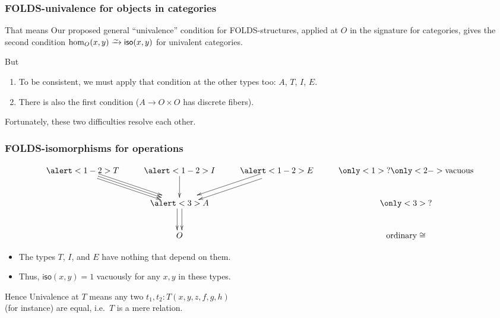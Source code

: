 \documentclass{beamer}
\begin{document}
\begin{frame}
  \frametitle{FOLDS-univalence for objects in categories}
  \begin{block}{That means}
    Our proposed general ``univalence'' condition for FOLDS-structures, applied at $O$ in the signature for categories, gives the second condition $\hom_O(x,y) \toiso \mathsf{iso}(x,y)$ for univalent categories.
  \end{block}
  \begin{block}{But}
    \begin{enumerate}
    \item To be consistent, we must apply that condition at the other types too: $A$, $T$, $I$, $E$.
    \item There is also the first condition ($A\to O\times O$ has discrete fibers).
    \end{enumerate}
  \end{block}
  Fortunately, these two difficulties resolve each other.
\end{frame}

\begin{frame}
  \frametitle{FOLDS-isomorphisms for operations}
  \[
  \vcenter{\xymatrix{
      \alert<1-2>{T} \ar[dr] \ar@<1mm>[dr] \ar@<-1mm>[dr] & \alert<1-2>{I} \ar[d] & \alert<1-2>{E} \ar@<1mm>[dl] \ar@<-1mm>[dl] &
      \only<1>{?}\only<2->{\text{vacuous}}\\
      & \alert<3>{A} \ar@<1mm>[d] \ar@<-1mm>[d] && \only<3>{?} \\
      & {O}&& \text{ordinary} \cong}}
  \]
  \pause
  \begin{itemize}
  \item The types $T$, $I$, and $E$ have \alert<2>{nothing} that depend on them.
  \item Thus, $\mathsf{iso}(x,y)=1$ vacuously for any $x,y$ in these types.
  \end{itemize}
  \begin{block}{Hence}
    Univalence at $T$ means any two $t_1,t_2 : T(x,y,z,f,g,h)$\\ (for instance) are equal, i.e.\ $T$ is a mere relation.
  \end{block}
\end{frame}
\end{document}

